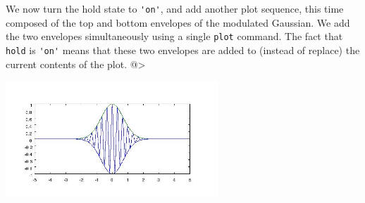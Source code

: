 We now turn the hold state to \verb|'on'|, and add another plot
sequence, this time composed of the top and bottom envelopes of
the modulated Gaussian.  We add the two envelopes simultaneously
using a single \verb|plot| command.  The fact that \verb|hold| is
\verb|'on'| means that these two envelopes are added to (instead of
replace) the current contents of the plot.
@>


\centerline{\includegraphics[width=8cm]{hold2}}

